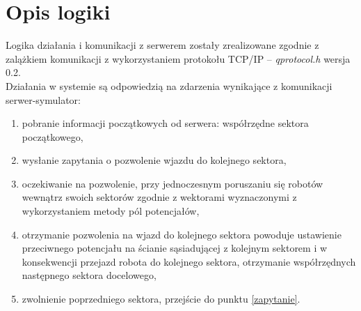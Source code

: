 \section{Opis logiki}

Logika działania i komunikacji z serwerem zostały zrealizowane zgodnie z zalążkiem komunikacji z wykorzystaniem protokołu TCP/IP -- \textit{qprotocol.h} wersja 0.2.\\

Działania w systemie są odpowiedzią na zdarzenia wynikające z komunikacji serwer-symulator:

\begin{enumerate}
  \item pobranie informacji początkowych od serwera: współrzędne
    sektora początkowego,

  \item wysłanie zapytania o pozwolenie wjazdu do kolejnego
    sektora, \label{zapytanie}

  \item oczekiwanie na pozwolenie, przy jednoczesnym poruszaniu się robotów wewnątrz swoich sektorów
    zgodnie z wektorami wyznaczonymi z wykorzystaniem metody pól potencjałów,
    
  \item otrzymanie pozwolenia na wjazd do kolejnego sektora powoduje
    ustawienie przeciwnego potencjału na ścianie sąsiadującej z
    kolejnym sektorem i w konsekwencji przejazd robota do kolejnego sektora, otrzymanie współrzędnych następnego sektora
    docelowego,

  \item zwolnienie poprzedniego sektora, przejście do punktu \ref{zapytanie}.

\end{enumerate}




